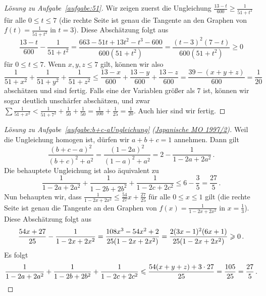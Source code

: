 \begin{proof}[Lösung zu Aufgabe~\ref{aufgabe:51}]
	Wir zeigen zuerst die Ungleichung $\frac{13-t}{600}\geqslant\frac1{51+t^2}$ für alle $0\leqslant t\leqslant7$ (die rechte Seite ist genau die Tangente an den Graphen von $f(t)=\frac{1}{51+t^2}$ in $t=3$). Diese Abschätzung folgt aus
	\begin{equation*}
		\frac{13-t}{600}-\frac1{51+t^2}=\frac{663-51t+13t^2-t^3-600}{600(51+t^2)}=\frac{(t-3)^2(7-t)}{600(51+t^2)}\geqslant0
	\end{equation*}für $0\leqslant t\leqslant7$. Wenn $x,y,z\leqslant7$ gilt, können wir also
	\begin{equation*}
		\frac1{51+x^2}+\frac1{51+y^2}+\frac1{51+z^2}\leqslant\frac{13-x}{600}+\frac{13-y}{600}+\frac{13-z}{600}=\frac{39-(x+y+z)}{600}=\frac1{20}
	\end{equation*}
	abschätzen und sind fertig. Falls eine der Variablen größer als 7 ist, können wir sogar deutlich unschärfer abschätzen, und zwar $\sum\frac1{51+x^2}<\frac1{51+7^2}+\frac1{50}+\frac1{50}= \frac1{100}+\frac1{25}=\frac1{20}$. Auch hier sind wir fertig.
\end{proof}
\begin{proof}[Lösung zu Aufgabe~\ref{aufgabe:b+c-aUngleichung} \textmd{(\href{https://artofproblemsolving.com/community/c5082_1997_japan_mo_finals}{Japanische MO 1997/2})}]
	Weil die Ungleichung homogen ist, dürfen wir $a+b+c=1$ annehmen. Dann gilt
	\begin{equation*}
		\frac{(b+c-a)^2}{(b+c)^2+a^2}=\frac{(1-2a)^2}{(1-a)^2+a^2}=2-\frac{1}{1-2a+2a^2}\,.
	\end{equation*}
	Die behauptete Ungleichung ist also äquivalent zu
	\begin{equation*}
		\frac{1}{1-2a+2a^2}+\frac{1}{1-2b+2b^2}+\frac{1}{1-2c+2c^2}\leqslant 6-\frac35=\frac{27}{5}\,.
	\end{equation*}
	Nun behaupten wir, dass $\frac{1}{1-2x+2x^2}\leqslant \frac{54}{27}x+\frac{27}{25}$ für alle $0\leqslant x\leqslant 1$ gilt (die rechte Seite ist genau die Tangente an den Graphen von $f(x)=\frac{1}{1-2x+2x^2}$ in $x=\frac13$). Diese Abschätzung folgt aus
	\begin{equation*}
		\frac{54x+27}{25}-\frac{1}{1-2x+2x^2}=\frac{108x^3-54x^2+2}{25\parens*{1-2x+2x^2}}=\frac{2(3x-1)^2(6x+1)}{25(1-2x+2x^2)}\geqslant 0\,.
	\end{equation*}
	Es folgt
	\begin{equation*}
		\frac{1}{1-2a+2a^2}+\frac{1}{1-2b+2b^2}+\frac{1}{1-2c+2c^2}\leqslant \frac{54(x+y+z)+3\cdot 27}{25}=\frac{105}{25}=\frac{27}{5}\,.\qedhere
	\end{equation*}
\end{proof}
